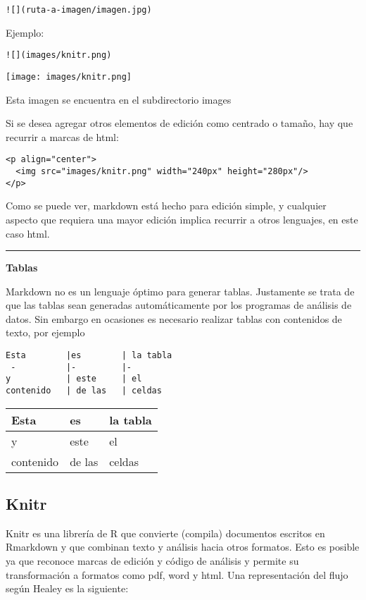 \documentclass[
  11pt,
]{book}
\begin{document}
\begin{verbatim}
![](ruta-a-imagen/imagen.jpg)
\end{verbatim}

Ejemplo:

\begin{verbatim}
![](images/knitr.png)
\end{verbatim}

\texttt{[image: images/knitr.png]}

Esta imagen se encuentra en el subdirectorio images

Si se desea agregar otros elementos de edición como centrado o tamaño, hay que recurrir a marcas de html:

\begin{verbatim}
<p align="center">
  <img src="images/knitr.png" width="240px" height="280px"/>
</p>
\end{verbatim}

Como se puede ver, markdown está hecho para edición simple, y cualquier aspecto que requiera una mayor edición implica recurrir a otros lenguajes, en este caso html.

\begin{center}\rule{0.5\linewidth}{0.5pt}\end{center}

\textbf{Tablas}

Markdown no es un lenguaje óptimo para generar tablas. Justamente se trata de que las tablas sean generadas automáticamente por los programas de análisis de datos. Sin embargo en ocasiones es necesario realizar tablas con contenidos de texto, por ejemplo

\begin{verbatim}
Esta        |es        | la tabla
 -          |-         |-
y           | este     | el
contenido   | de las   | celdas
\end{verbatim}

\begin{longtable}[]{@{}lll@{}}
\toprule
Esta & es & la tabla\tabularnewline
\midrule
\endhead
y & este & el\tabularnewline
contenido & de las & celdas\tabularnewline
\bottomrule
\end{longtable}

\hypertarget{knitr}{%
\subsection{Knitr}\label{knitr}}

Knitr es una librería de R que convierte (compila) documentos escritos en Rmarkdown y que combinan texto y análisis hacia otros formatos. Esto es posible ya que reconoce marcas de edición y código de análisis y permite su transformación a formatos como pdf, word y html. Una representación del flujo según Healey es la siguiente:
\end{document}
